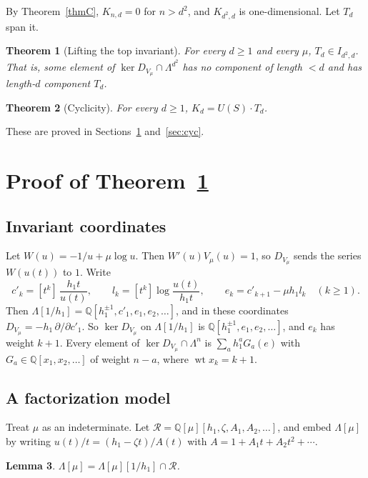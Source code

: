 \documentclass[11pt]{article}
\newtheorem{theorem}{Theorem}
\newtheorem{lemma}[theorem]{Lemma}
\theoremstyle{definition}
\theoremstyle{remark}
\newcommand{\Q}{\mathbb{Q}}
\newcommand{\La}{\Lambda}
\begin{document}
By Theorem~\ref{thmC}, $K_{n,d}=0$ for $n>d^2$, and $K_{d^2,d}$ is one-dimensional. Let $T_d$ span it.

\begin{theorem}[Lifting the top invariant]\label{thmL}
For every $d\ge1$ and every $\mu$, $T_d\in I_{d^2,d}$. That is, some element of $\ker D_{V_\mu}\cap\La^{d^2}$ has
no component of length $<d$ and has length-$d$ component $T_d$.
\end{theorem}

\begin{theorem}[Cyclicity]\label{cyc}
For every $d\ge1$, $K_d=U(S)\cdot T_d$.
\end{theorem}

These are proved in Sections~\ref{sec:L} and~\ref{sec:cyc}.

\section{Proof of Theorem~\ref{thmL}}\label{sec:L}

\subsection{Invariant coordinates}

Let $W(u)=-1/u+\mu\log u$. Then $W'(u)V_\mu(u)=1$, so $D_{V_\mu}$ sends the series $W(u(t))$ to $1$. Write
\[
  c'_k=[t^k]\,\frac{h_1t}{u(t)},\qquad l_k=[t^k]\log\frac{u(t)}{h_1t},\qquad e_k=c'_{k+1}-\mu h_1l_k\quad(k\ge1).
\]
Then $\La[1/h_1]=\Q[h_1^{\pm1},c'_1,e_1,e_2,\dots]$, and in these coordinates $D_{V_\mu}=-h_1\,\partial/\partial c'_1$.
So $\ker D_{V_\mu}$ on $\La[1/h_1]$ is $\Q[h_1^{\pm1},e_1,e_2,\dots]$, and $e_k$ has weight $k+1$. Every element
of $\ker D_{V_\mu}\cap\La^n$ is $\sum_ah_1^aG_a(e)$ with $G_a\in\Q[x_1,x_2,\dots]$ of weight $n-a$, where
$\operatorname{wt}x_k=k+1$.

\subsection{A factorization model}

Treat $\mu$ as an indeterminate. Let $\mathcal R=\Q[\mu][h_1,\zeta,A_1,A_2,\dots]$, and embed $\La[\mu]$ by
writing $u(t)/t=(h_1-\zeta t)/A(t)$ with $A=1+A_1t+A_2t^2+\cdots$.

\begin{lemma}\label{fact}
$\La[\mu]=\La[\mu][1/h_1]\cap\mathcal R$.
\end{lemma}
\end{document}
